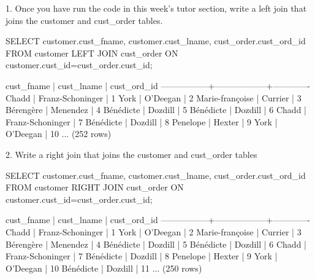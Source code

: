 
1. Once you have run the code in this week's tutor section, write a left join that joins the customer and cust\_order tables.
\begin{sql}
SELECT customer.cust_fname, customer.cust_lname, cust_order.cust_ord_id FROM customer
LEFT JOIN cust_order ON customer.cust_id=cust_order.cust_id;
\end{sql}
\begin{pseudo*}
   cust_fname    |    cust_lname    | cust_ord_id
-----------------+------------------+-------------
 Chadd           | Franz-Schoninger |           1
 York            | O'Deegan         |           2
 Marie-françoise | Currier          |           3
 Bérengère       | Menendez         |           4
 Bénédicte       | Dozdill          |           5
 Bénédicte       | Dozdill          |           6
 Chadd           | Franz-Schoninger |           7
 Bénédicte       | Dozdill          |           8
 Penelope        | Hexter           |           9
 York            | O'Deegan         |          10
 ...
(252 rows)
\end{pseudo*}

2. Write a right join that joins the customer and cust\_order tables
\begin{sql}
SELECT customer.cust_fname, customer.cust_lname, cust_order.cust_ord_id FROM customer
RIGHT JOIN cust_order ON customer.cust_id=cust_order.cust_id;
\end{sql}
\begin{pseudo*}
   cust_fname    |    cust_lname    | cust_ord_id
-----------------+------------------+-------------
 Chadd           | Franz-Schoninger |           1
 York            | O'Deegan         |           2
 Marie-françoise | Currier          |           3
 Bérengère       | Menendez         |           4
 Bénédicte       | Dozdill          |           5
 Bénédicte       | Dozdill          |           6
 Chadd           | Franz-Schoninger |           7
 Bénédicte       | Dozdill          |           8
 Penelope        | Hexter           |           9
 York            | O'Deegan         |          10
 Bénédicte       | Dozdill          |          11
 ...
(250 rows)
\end{pseudo*}

